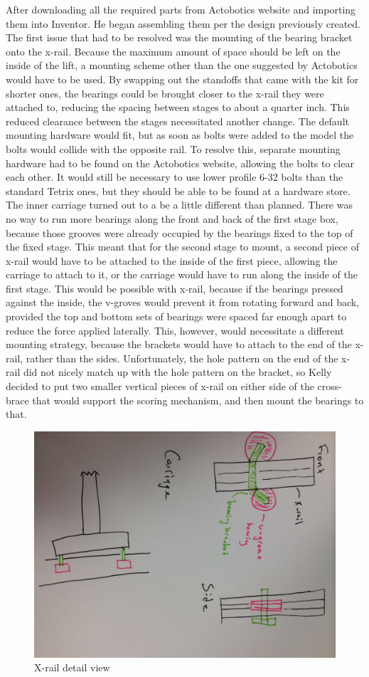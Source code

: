 \documentclass{article}
\begin{document}
 After downloading all the required parts from Actobotics website and importing them into Inventor. He began assembling them per the design previously created. The first issue that had to be resolved was the mounting of the bearing bracket onto the x-rail. Because the maximum amount of space should be left on the inside of the lift, a mounting scheme other than the one suggested by Actobotics would have to be used. By swapping out the standoffs that came with the kit for shorter ones, the bearings could be brought closer to the x-rail they were attached to, reducing the spacing between stages to about a quarter inch. This reduced clearance between the stages necessitated another change. The default mounting hardware would fit, but as soon as bolts were added to the model the bolts would collide with the opposite rail. To resolve this, separate mounting hardware had to be found on the Actobotics website, allowing the bolts to clear each other. It would still be necessary to use lower profile 6-32 bolts than the standard Tetrix ones, but they should be able to be found at a hardware store. The inner carriage turned out to a be a little different than planned. There was no way to run more bearings along the front and back of the first stage box, because those grooves were already occupied by the bearings fixed to the top of the fixed stage. This meant that for the second stage to mount, a second piece of x-rail would have to be attached to the inside of the first piece, allowing the carriage to attach to it, or the carriage would have to run along the inside of the first stage. This would be possible with x-rail, because if the bearings pressed against the inside, the v-groves would prevent it from rotating forward and back, provided the top and bottom sets of bearings were spaced far enough apart to reduce the force applied laterally. This, however, would necessitate a different mounting strategy, because the brackets would have to attach to the end of the x-rail, rather than the sides. Unfortunately, the hole pattern on the end of the x-rail did not nicely match up with the hole pattern on the bracket, so Kelly decided to put two smaller vertical pieces of x-rail on either side of the cross-brace that would support the scoring mechanism, and then mount the bearings to that. 
 
 \begin{figure}
     \centering
     \includegraphics[width=.6\textwidth]{05_10-01/images/xrail.jpg}
     \caption{X-rail detail view}
     \label{fig:my_label}
 \end{figure}
\end{document}
